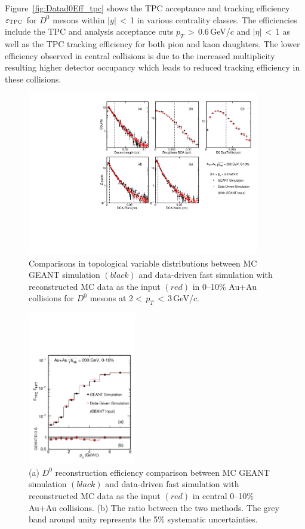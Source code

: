 \documentclass[%
 reprint,	
showpacs,
 amsmath,amssymb,
 aps,
 prc,
]{revtex4-1}
\begin{document}
Figure~\ref{fig:Datad0Eff_tpc} shows the TPC acceptance and tracking efficiency $\varepsilon_{\rm TPC}$ for $D^0$ mesons within $|y|$\,$<$\,1 in various centrality classes. The efficiencies include the TPC and analysis acceptance cuts $p_{T}$\,$>$\,0.6\,GeV/$c$ and $|\eta|$\,$<$\,1 as well as the TPC tracking efficiency for both pion and kaon daughters. The lower efficiency observed in central collisions is due to the increased multiplicity resulting higher detector occupancy which leads to reduced tracking efficiency in these collisions.



\begin{figure}
\centering
\includegraphics[width=0.90\textwidth]{fig/McTopo.pdf}
\caption{Comparisons in topological variable distributions between MC GEANT simulation $(black)$ and data-driven fast simulation with reconstructed MC data as the input $(red)$ in 0--10\% Au+Au collisions for $D^0$ mesons at 2$<$\,$p_T$\,$<$\,3\,GeV/$c$.}
\label{fig:McTopo} 
\end{figure}


\begin{figure}
\centering
\includegraphics[width=0.42\textwidth]{fig/Mcd0Eff_0_10.pdf}
  \caption{(a) $D^{0}$ reconstruction efficiency comparison between MC GEANT simulation $(black)$ and data-driven fast simulation with reconstructed MC data as the input $(red)$ in central 0--10\% Au+Au collisions. (b) The ratio between the two methods. The grey band around unity represents the 5\% systematic uncertainties.}
\label{fig:Mcd0Eff_0_10} 
\end{figure}
\end{document}
